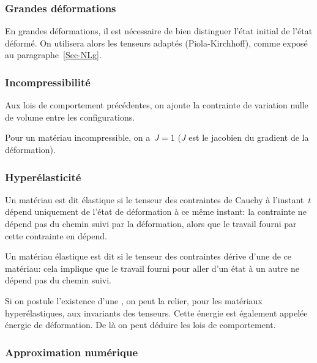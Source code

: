 \medskip
\subsubsection{Grandes déformations}

En grandes déformations, il est nécessaire de bien distinguer l'état initial de
l'état déformé. On utilisera alors les tenseurs adaptés (Piola-Kirchhoff), comme exposé au paragraphe~\ref{Sec-NLg}.


\medskip
\subsubsection{Incompressibilité}

Aux lois de comportement précédentes, on ajoute la contrainte de variation nulle de volume entre les configurations.

Pour un matériau incompressible, on a~$J=1$ ($J$ est le jacobien du gradient de la déformation).

\medskip
\subsubsection{Hyperélasticité}

Un matériau est dit élastique si le tenseur des contraintes de Cauchy à l'instant~$t$ dépend uniquement de l'état de déformation à ce même instant: la contrainte ne dépend pas du chemin suivi par la déformation, alors que le travail fourni par cette contrainte en dépend.

Un matériau élastique est dit  si le tenseur des contraintes dérive d'une  de ce matériau: cela implique que le travail fourni pour aller d'un état à un autre ne dépend pas du chemin suivi.

Si on postule l'existence d'une , on peut la relier, pour les matériaux hyperélastiques, aux invariants des tenseurs. Cette énergie est également appelée énergie de déformation. De là on peut déduire les lois de comportement.


\medskip
\subsubsection{Approximation numérique}

